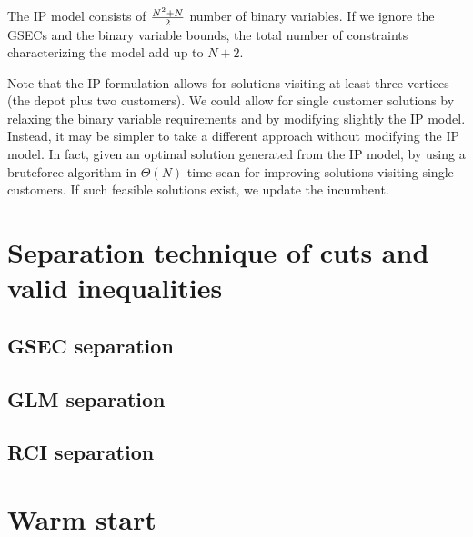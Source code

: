 The IP model consists of ${N^2 + N} \over 2$ number of binary variables.
If we ignore the GSECs and the binary variable bounds, the total number of constraints characterizing the model add up to $N + 2$.

Note that the IP formulation allows for solutions visiting at least three vertices (the depot plus two customers).
We could allow for single customer solutions by relaxing the binary variable requirements and by modifying slightly the IP model.
Instead, it may be simpler to take a different approach without modifying the IP model.
In fact, given an optimal solution generated from the IP model, by using a bruteforce algorithm in $\Theta(N)$ time scan for improving solutions visiting single customers.
If such feasible solutions exist, we update the incumbent.


\section{Separation technique of cuts and valid inequalities}

\subsection{GSEC separation}

\subsection{GLM separation}

\subsection{RCI separation}

\section{Warm start}
